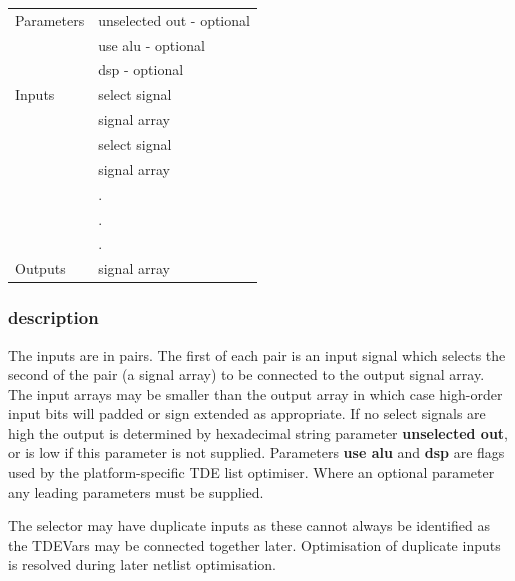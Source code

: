 \documentclass[10pt,a4paper,twoside,fleqn]{book}
\begin{document}
                    \begin{tabular}{| l | l |}
                    \hline
                    Parameters  & unselected out - optional \\
                                & use alu - optional \\
                                & dsp - optional \\
                    \hline
                    Inputs      & select signal \\
                                & signal array \\
                                & select signal \\
                                & signal array \\
                                & . \\
                                & . \\
                                & . \\
                    \hline
                    Outputs     & signal array \\
                    \hline
                    \end{tabular}

                \subsubsection{description}

                    The inputs are in pairs. The first of each pair is an input
                    signal which selects the second of the pair (a signal array)
                    to be connected to the output signal array. The input arrays
                    may be smaller than the output array in which case
                    high-order input bits will padded or sign extended as
                    appropriate. If no select signals are high the output is
                    determined by hexadecimal string parameter {\bf unselected
                    out}, or is low if this parameter is not supplied.
                    Parameters {\bf use alu} and {\bf dsp} are flags used by the
                    platform-specific TDE list optimiser. Where an optional
                    parameter any leading parameters must be supplied.
                    
                    The selector may have duplicate inputs as these cannot
                    always be identified as the TDEVars may be connected together
                    later. Optimisation of duplicate inputs is resolved during
                    later netlist optimisation.
\end{document}
